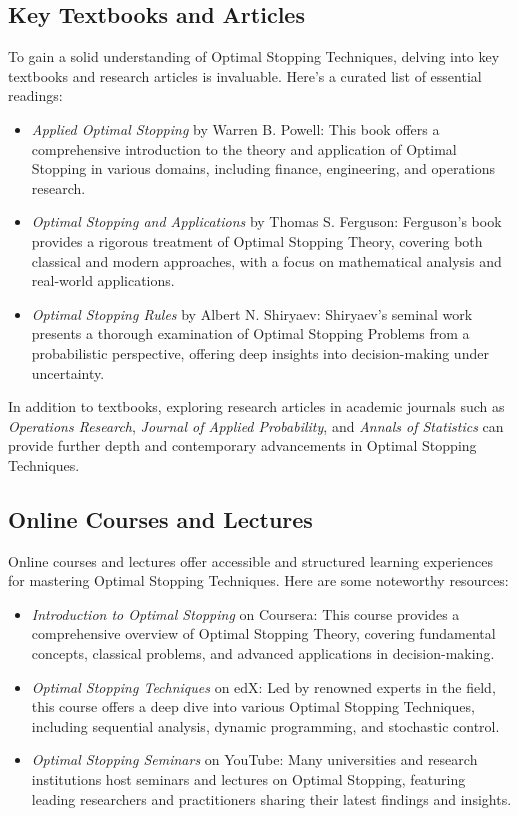 \documentclass[12pt]{book} %
\begin{document}
\subsection{Key Textbooks and Articles}
To gain a solid understanding of Optimal Stopping Techniques, delving into key textbooks and research articles is invaluable. Here's a curated list of essential readings:

\begin{itemize}
    \item \textit{Applied Optimal Stopping} by Warren B. Powell: This book offers a comprehensive introduction to the theory and application of Optimal Stopping in various domains, including finance, engineering, and operations research.
    
    \item \textit{Optimal Stopping and Applications} by Thomas S. Ferguson: Ferguson's book provides a rigorous treatment of Optimal Stopping Theory, covering both classical and modern approaches, with a focus on mathematical analysis and real-world applications.
    
    \item \textit{Optimal Stopping Rules} by Albert N. Shiryaev: Shiryaev's seminal work presents a thorough examination of Optimal Stopping Problems from a probabilistic perspective, offering deep insights into decision-making under uncertainty.
\end{itemize}

In addition to textbooks, exploring research articles in academic journals such as \textit{Operations Research}, \textit{Journal of Applied Probability}, and \textit{Annals of Statistics} can provide further depth and contemporary advancements in Optimal Stopping Techniques.

\subsection{Online Courses and Lectures}
Online courses and lectures offer accessible and structured learning experiences for mastering Optimal Stopping Techniques. Here are some noteworthy resources:

\begin{itemize}
    \item \textit{Introduction to Optimal Stopping} on Coursera: This course provides a comprehensive overview of Optimal Stopping Theory, covering fundamental concepts, classical problems, and advanced applications in decision-making.
    
    \item \textit{Optimal Stopping Techniques} on edX: Led by renowned experts in the field, this course offers a deep dive into various Optimal Stopping Techniques, including sequential analysis, dynamic programming, and stochastic control.
    
    \item \textit{Optimal Stopping Seminars} on YouTube: Many universities and research institutions host seminars and lectures on Optimal Stopping, featuring leading researchers and practitioners sharing their latest findings and insights.
\end{itemize}
\end{document}
